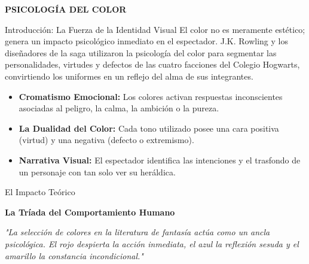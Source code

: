 \documentclass[aspectratio=169]{beamer}
\title{\saga}
\subtitle{El Significado de la Identidad Visual en Hogwarts}
\author{\yo}
\institute{\escuela}
\date{\today}
\newcommand{\saga}{\textbf{PSICOLOGÍA DEL COLOR}}
\begin{document}

\begin{frame}
  \titlepage
\end{frame}

\begin{frame}{\saga}
\vspace{0.1 cm}

\begin{block}{Introducción: La Fuerza de la Identidad Visual}
{\fontsize{9.5pt}{11pt}\selectfont 
El color no es meramente estético; genera un impacto psicológico inmediato en el espectador. J.K. Rowling y los diseñadores de la saga utilizaron la psicología del color para segmentar las personalidades, virtudes y defectos de las cuatro facciones del Colegio Hogwarts, convirtiendo los uniformes en un reflejo del alma de sus integrantes.
}
\end{block}

\vspace{-0.1 cm}
{\fontsize{9.5pt}{11pt}\selectfont
\begin{itemize}
  \item \textbf{Cromatismo Emocional:} Los colores activan respuestas inconscientes asociadas al peligro, la calma, la ambición o la pureza.
  \item \textbf{La Dualidad del Color:} Cada tono utilizado posee una cara positiva (virtud) y una negativa (defecto o extremismo).
  \item \textbf{Narrativa Visual:} El espectador identifica las intenciones y el trasfondo de un personaje con tan solo ver su heráldica.
\end{itemize}
}
\end{frame}

\begin{frame}{El Impacto Teórico}
\begin{center}
    \large\color{burgundy}\textbf{La Tríada del Comportamiento Humano}
    \vfill
    \begin{minipage}{0.75\linewidth}
    \centering\itshape
    "La selección de colores en la literatura de fantasía actúa como un ancla psicológica. El rojo despierta la acción inmediata, el azul la reflexión sesuda y el amarillo la constancia incondicional."
    \end{minipage}
    \vfill
\end{center}
\end{frame}
\end{document}
